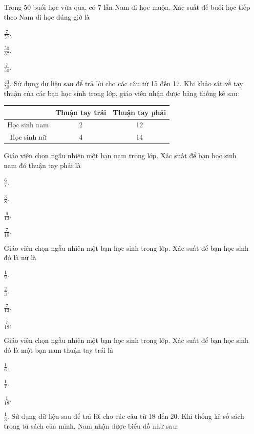 \documentclass[%
    fontsize=12pt,%
    chapterprefix=false,%
    open=right,%
    twoside=false,%
    numbers=noenddot,%
    headings=optiontohead,%
    final,%
    DIV=15,%
    parskip=half %
]{scrbook}
\begin{document}
\begin{tracnghiem}
\item Trong 50 buổi học vừa qua, có 7 lần Nam đi học muộn. Xác suất để buổi học tiếp theo Nam đi học đúng giờ là
\begin{options}
  \item $ \frac{7}{57} $.
  \item $ \frac{50}{57} $.
  \item $ \frac{7}{50} $.
  \item $ \frac{43}{50} $. Sử dụng dữ liệu sau để trả lời cho các câu từ 15 đến 17. Khi khảo sát về tay thuận của các bạn học sinh trong lớp, giáo viên nhận được bảng thống kê sau: \begin{tabular}{|c|c|c|} \hline & Thuận tay trái & Thuận tay phải \\ \hline Học sinh nam & 2 & 12 \\ \hline Học sinh nữ & 4 & 14 \\ \hline \end{tabular}
\end{options}

\item Giáo viên chọn ngẫu nhiên một bạn nam trong lớp. Xác suất để bạn học sinh nam đó thuận tay phải là
\begin{options}
  \item $ \frac{6}{7} $.
  \item $ \frac{3}{8} $.
  \item $ \frac{6}{13} $.
  \item $ \frac{7}{16} $.
\end{options}

\item Giáo viên chọn ngẫu nhiên một bạn học sinh trong lớp. Xác suất để bạn học sinh đó là nữ là
\begin{options}
  \item $ \frac{1}{2} $.
  \item $ \frac{2}{3} $.
  \item $ \frac{7}{13} $.
  \item $ \frac{7}{18} $.
\end{options}

\item Giáo viên chọn ngẫu nhiên một bạn học sinh trong lớp. Xác suất để bạn học sinh đó là một bạn nam thuận tay trái là
\begin{options}
  \item $ \frac{1}{6} $.
  \item $ \frac{1}{7} $.
  \item $ \frac{1}{18} $.
  \item $ \frac{1}{3} $. Sử dụng dữ liệu sau để trả lời cho các câu từ 18 đến 20. Khi thống kê số sách trong tủ sách của mình, Nam nhận được biểu đồ như sau:
\end{options}


\end{tracnghiem}
\end{document}
